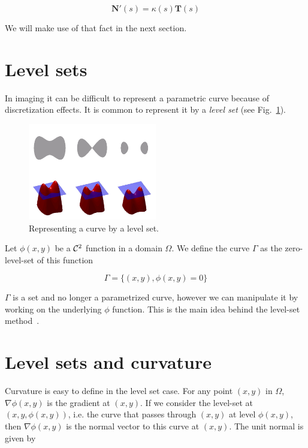 \documentclass[11pt,a4paper]{article}
\begin{document}
	\begin{equation}
	\mathbf{N}'(s) = \kappa(s)\mathbf{T}(s)
	\end{equation}
	
	We will make use of that fact in the next section.
	
	\section*{Level sets}
	
	In imaging it can be difficult to represent a parametric curve because of discretization effects. It is common to
	represent it by a {\em level set} (see Fig.~\ref{fig:level_set}).
	
	\begin{figure}
		\centering
		\includegraphics[width=0.5\textwidth]{Images/Level_set_method.jpg}
		\caption{Representing a curve by a level set.\label{fig:level_set}}
	\end{figure}
	
	Let $\phi(x,y)$ be a ${\cal C}^2$ function in a domain $\Omega$. We define the curve $\Gamma$ as the zero-level-set of this function
	
	\begin{equation}
	\Gamma = \{(x,y), \phi(x,y) = 0\}
	\end{equation}
	
	$\Gamma$ is a set and no longer a parametrized curve, however we can manipulate it by working on the underlying $\phi$ function. This is the main idea behind the level-set method~\cite{Sethian-level-sets-1999}.
	

	
	\section*{Level sets and curvature}
	
	Curvature is easy to define in the level set case. For any point $(x,y)$ in $\Omega$, $\nabla \phi (x,y)$ is the gradient at $(x,y)$. If we consider the level-set at $(x,y,\phi(x,y))$, i.e. the curve that passes through $(x,y)$ at level $\phi(x,y)$, 
	then $\nabla \phi(x,y)$ is the normal vector to this curve at $(x,y)$. The unit normal is given by
	
\end{document}
